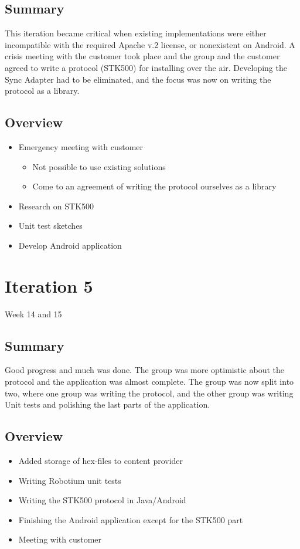 \subsection{Summary}
	This iteration became critical when existing implementations were either incompatible with the required Apache v.2 license, or nonexistent on Android.
	A crisis meeting with the customer took place and the group and the customer agreed to write
	a protocol (STK500) for installing over the air. Developing the Sync Adapter had to be eliminated, and the focus was now on writing the protocol as a library.

\subsection{Overview}
\begin{itemize}
	\item{Emergency meeting with customer}
	\begin{itemize}
		\item{Not possible to use existing solutions}
		\item{Come to an agreement of writing the protocol ourselves as a library}
	\end{itemize}
	\item{Research on STK500}
	\item{Unit test sketches}
	\item{Develop Android application}
\end{itemize}

\section{Iteration 5}
Week 14 and 15
\subsection{Summary}
	Good progress and much was done. The group was more optimistic about the protocol and the application was almost complete.
	The group was now split into two, where one group was writing the protocol, and the other group was writing Unit tests and polishing the last parts of the application.

\subsection{Overview}
\begin{itemize}
	\item{Added storage of hex-files to content provider}
	\item{Writing Robotium unit tests}
	\item{Writing the STK500 protocol in Java/Android}
	\item{Finishing the Android application except for the STK500 part}
	\item{Meeting with customer}
\end{itemize}

